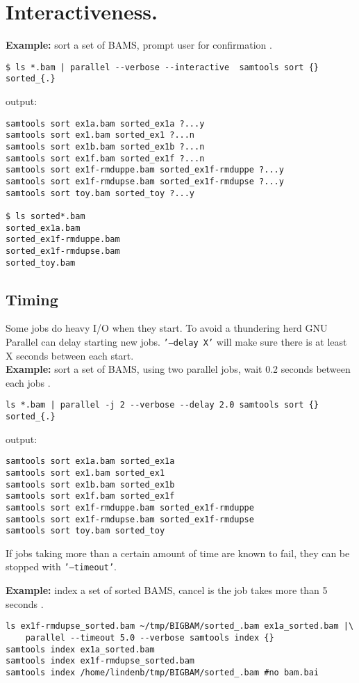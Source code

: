 \documentclass{article}
\newcommand{\example}[1]{
\textbf{Example: } {\color[rgb]{0,0,1} #1 } .
}
\newcommand{\cmdoption}[1]{\texttt{'#1'}}
\begin{document}
\section{Interactiveness.}
\example{sort a set of BAMS, prompt user for confirmation }
\begin{lstlisting}
$ ls *.bam | parallel --verbose --interactive  samtools sort {} sorted_{.}
\end{lstlisting}
output:
\begin{lstlisting}
samtools sort ex1a.bam sorted_ex1a ?...y
samtools sort ex1.bam sorted_ex1 ?...n
samtools sort ex1b.bam sorted_ex1b ?...n
samtools sort ex1f.bam sorted_ex1f ?...n
samtools sort ex1f-rmduppe.bam sorted_ex1f-rmduppe ?...y
samtools sort ex1f-rmdupse.bam sorted_ex1f-rmdupse ?...y
samtools sort toy.bam sorted_toy ?...y

$ ls sorted*.bam
sorted_ex1a.bam
sorted_ex1f-rmduppe.bam
sorted_ex1f-rmdupse.bam
sorted_toy.bam
\end{lstlisting}



\subsection{Timing}
Some jobs do heavy I/O when they start. To avoid a thundering herd GNU Parallel can delay starting new jobs. \cmdoption{--delay X} will make sure there is at least X seconds between each start.\\
\example{sort a set of BAMS, using two parallel jobs, wait 0.2 seconds between each jobs}
\begin{lstlisting}
ls *.bam | parallel -j 2 --verbose --delay 2.0 samtools sort {} sorted_{.}
\end{lstlisting}
output:
\begin{lstlisting}
samtools sort ex1a.bam sorted_ex1a
samtools sort ex1.bam sorted_ex1
samtools sort ex1b.bam sorted_ex1b
samtools sort ex1f.bam sorted_ex1f
samtools sort ex1f-rmduppe.bam sorted_ex1f-rmduppe
samtools sort ex1f-rmdupse.bam sorted_ex1f-rmdupse
samtools sort toy.bam sorted_toy
\end{lstlisting}
If jobs taking more than a certain amount of time are known to fail, they can be stopped with \cmdoption{--timeout}.
\example{index a set of sorted BAMS, cancel is the job takes more than 5 seconds}
\begin{lstlisting}
ls ex1f-rmdupse_sorted.bam ~/tmp/BIGBAM/sorted_.bam ex1a_sorted.bam |\
	parallel --timeout 5.0 --verbose samtools index {} 
samtools index ex1a_sorted.bam
samtools index ex1f-rmdupse_sorted.bam
samtools index /home/lindenb/tmp/BIGBAM/sorted_.bam #no bam.bai
\end{lstlisting}
\end{document}
